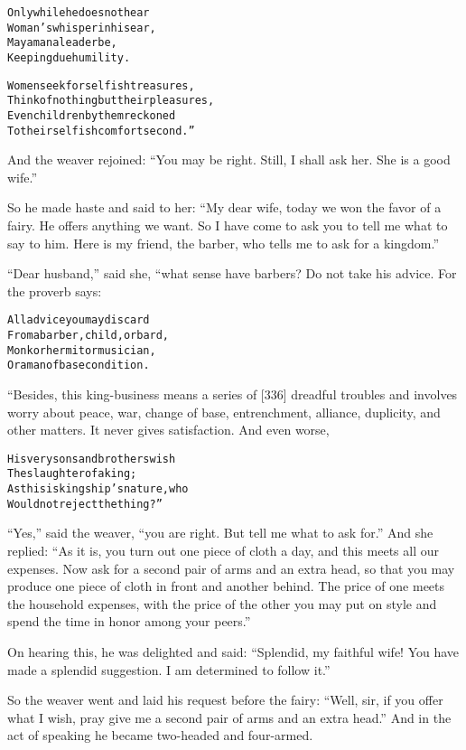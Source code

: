 \documentclass{article}
\renewenvironment{verbatim}{\begin{alltt}\normalfont\begin{centering}}{\end{centering}\end{alltt}}
\begin{document}
\begin{verbatim}
Only while he does not hear
Woman's whisper in his ear,
May a man a leader be,
Keeping due humility.

Women seek for selfish treasures,
Think of nothing but their pleasures,
Even children by them reckoned
To their selfish comfort second.”
\end{verbatim}
And the weaver rejoined:
``You may be right. Still, I shall ask her. She is a good wife.''

So he made haste and said to her:
``My dear wife, today we won the favor of a fairy. He offers anything we want. So I have come to ask you to tell me what to say to him. Here is my friend, the barber, who tells me to ask for a kingdom.''

``Dear husband,'' said she, “what sense have barbers? Do not take
his advice. For the proverb says:

\begin{verbatim}
All advice you may discard
From a barber, child, or bard,
Monk or hermit or musician,
Or a man of base condition.
\end{verbatim}
“Besides, this king-business means a series of [336] dreadful
troubles and involves worry about peace, war, change of base,
entrenchment, alliance, duplicity, and other matters. It never
gives satisfaction. And even worse,

\begin{verbatim}
His very sons and brothers wish
    The slaughter of a king;
As this is kingship's nature, who
    Would not reject the thing?”
\end{verbatim}
``Yes,'' said the weaver,
``you are right. But tell me what to ask for.'' And she replied:
``As it is, you turn out one piece of cloth a day, and this meets all our expenses. Now ask for a second pair of arms and an extra head, so that you may produce one piece of cloth in front and another behind. The price of one meets the household expenses, with the price of the other you may put on style and spend the time in honor among your peers.''

On hearing this, he was delighted and said:
``Splendid, my faithful wife! You have made a splendid suggestion. I am determined to follow it.''

So the weaver went and laid his request before the fairy:
``Well, sir, if you offer what I wish, pray give me a second pair of arms and an extra head.''
And in the act of speaking he became two-headed and four-armed.
\end{document}

